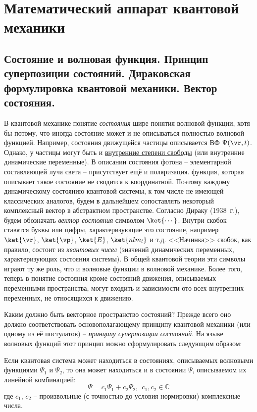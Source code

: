 \chapter{Математический аппарат квантовой механики}

\begin{sloppypar}
  \section{Состояние и волновая функция. Принцип суперпозиции состояний. Дираковская формулировка квантовой механики. Вектор состояния.}
\end{sloppypar}

В квантовой механике понятие {\em состояния} шире понятия волновой функции, хотя бы потому, что иногда состояние может и не описываться полностью волновой функцией. Например, состояния движущейся частицы описывается ВФ $\Psi(\vr, t)$. Однако, у частицы могут быть и \underline{внутренние степени свободы} (или внутренние динамические переменные). В описании состояния фотона -- элементарной составляющей луча света -- присутствует ещё и поляризация. функция, которая описывает такое состояние не сводится к координатной. Поэтому каждому динамическому состоянию квантовой системы, к том числе не имеющей классических аналогов, будем в дальнейшем сопоставлять некоторый комплексный вектор в абстрактном пространстве. Согласно Дираку (1938~г.), будем обозначать {\em вектор состояния} символом $\ket{\cdots}$. Внутри скобок ставятся буквы или цифры, характеризующие это состояние, например $\ket{\vr}$, $\ket{\vp}$, $\ket{E}$, $\ket{nlm_l}$ и т.д. <<Начинка>> скобок, как правило, состоит из {\em квантовых чисел} (значений динамических переменных, характеризующих состояния системы). В общей квантовой теории эти символы играют ту же роль, что и волновые функции в волновой механике. Более того, теперь в понятие состояния кроме состояний движения, описываемых переменными пространства, могут входить и зависимости ото всех внутренних переменных, не относящихся к движению.

Каким должно быть векторное пространство состояний? Прежде всего оно должно соответствовать основополагающему принципу квантовой механики (или одному из её постулатов) -- {\em принципу суперпозиции состояний}. На языке волновых функций этот принцип можно сформулировать следующим образом:
%
\begin{stmt}
Если квантовая система может находиться в состояниях, описываемых волновыми функциями $\Psi_1$ и $\Psi_2$, то она может находиться и в состоянии $\Psi$, описываемом их линейной комбинацией:
$$
\Psi = c_1 \Psi_1 + c_2 \Psi_2, ~~c_1, c_2 \in \mathbb{C}
$$%
%
где $c_1$, $c_2$ -- произвольные (с точностью до условия нормировки) комплексные числа.
\end{stmt}


